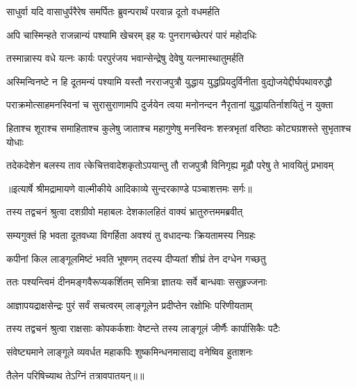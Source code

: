 \twolineshloka
{साधुर्वा यदि वासाधुर्परैरेष समर्पितः}
{ब्रुवन्परार्थं परवान्न दूतो वधमर्हति} %

\twolineshloka
{अपि चास्मिन्हते राजन्नान्यं पश्यामि खेचरम्}
{इह यः पुनरागच्छेत्परं पारं महोदधिः} %

\twolineshloka
{तस्मान्नास्य वधे यत्नः कार्यः परपुरंजय}
{भवान्सेन्द्रेषु देवेषु यत्नमास्थातुमर्हति} %

\fourlineindentedshloka
{अस्मिन्विनष्टे न हि दूतमन्यं}
{ पश्यामि यस्तौ नरराजपुत्रौ}
{युद्धाय युद्धप्रियदुर्विनीता}
{वुद्योजयेद्दीर्घपथावरुद्धौ} %

\fourlineindentedshloka
{पराक्रमोत्साहमनस्विनां च}
{ सुरासुराणामपि दुर्जयेन}
{त्वया मनोनन्दन नैरृतानां}
{ युद्धायतिर्नाशयितुं न युक्ता} %

\fourlineindentedshloka
{हिताश्च शूराश्च समाहिताश्च}
{ कुलेषु जाताश्च महागुणेषु}
{मनस्विनः शस्त्रभृतां वरिष्ठाः}
{ कोट्यग्रशस्ते सुभृताश्च योधाः} %

\fourlineindentedshloka
{तदेकदेशेन बलस्य ताव}
{त्केचित्तवादेशकृतोऽपयान्तु}
{तौ राजपुत्रौ विनिगृह्य मूढौ}
{ परेषु ते भावयितुं प्रभावम्} %


{॥इत्यार्षे श्रीमद्रामायणे वाल्मीकीये आदिकाव्ये सुन्दरकाण्डे पञ्चाशत्तमः सर्गः॥}


\twolineshloka
{तस्य तद्वचनं श्रुत्वा दशग्रीवो महाबलः}
{देशकालहितं वाक्यं भ्रातुरुत्तममब्रवीत्} %

\twolineshloka
{सम्यगुक्तं हि भवता दूतवध्या विगर्हिता}
{अवश्यं तु वधादन्यः क्रियतामस्य निग्रहः} %

\twolineshloka
{कपीनां किल लाङ्गूलमिष्टं भवति भूषणम्}
{तदस्य दीप्यतां शीघ्रं तेन दग्धेन गच्छतु} %

\twolineshloka
{ततः पश्यन्त्विमं दीनमङ्गवैरूप्यकर्शितम्}
{समित्रा ज्ञातयः सर्वे बान्धवाः ससुहृज्जनाः} %

\twolineshloka
{आज्ञापयद्राक्षसेन्द्रः पुरं सर्वं सचत्वरम्}
{लाङ्गूलेन प्रदीप्तेन रक्षोभिः परिणीयताम्} %

\twolineshloka
{तस्य तद्वचनं श्रुत्वा राक्षसाः कोपकर्कशाः}
{वेष्टन्ते तस्य लाङ्गूलं जीर्णैः कार्पासिकैः पटैः} %

\twolineshloka
{संवेष्ट्यमाने लाङ्गूले व्यवर्धत महाकपिः}
{शुष्कमिन्धनमासाद्य वनेष्विव हुताशनः} %

{तैलेन परिषिच्याथ तेऽग्निं तत्रावपातयन्॥॥} %

